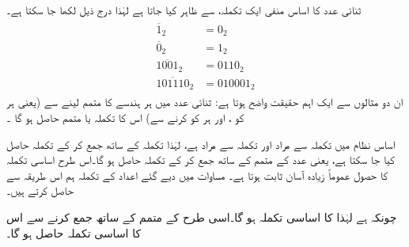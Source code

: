  ثنائی عدد     کا اساس منفی ایک  تکملہ،      سے ظاہر کیا جاتا ہے لہٰذا  درج ذیل لکھا جا سکتا ہے۔
\begin{gather}
\begin{aligned}
\overline{1}_2&=0_2\\
\overline{0}_2&=1_2\\
\overline{1001}_2&=0110_2\\
\overline{101110}_2&=010001_2
\end{aligned}
\end{gather}
ان دو مثالوں سے ایک اہم  حقیقت   واضح ہوتا ہے: ثنائی عدد  میں ہر ہندسے کا متمم لینے سے (یعنی  ہر   کو ،  اور ہر   کو  کرنے سے)  اس کا تکملہ  یا متمم  حاصل ہو گا ۔


  اساس  نظام میں  تکملہ  سے مراد    اور تکملہ    سے مراد  ہے،  لہٰذا تکملہ  کے ساتھ  جمع کر کے  تکملہ حاصل کیا جا سکتا ہے، یعنی عدد کے متمم کے ساتھ    جمع کر کے تکملہ  حاصل ہو گا۔اس طرح اساسی تکملہ کا حصول عموماً   زیادہ آسان ثابت ہوتا ہے۔  مساوات  میں دیے گئے   اعداد کے  تکملہ    ہم اس طریقہ سے حاصل کرتے ہیں۔
  
چونکہ  ہے    لہٰذا    کا اساسی تکملہ   ہو گا۔اسی طرح    کے متمم    کے ساتھ  جمع کرنے سے اس    کا اساسی تکملہ  حاصل  ہو گا۔

